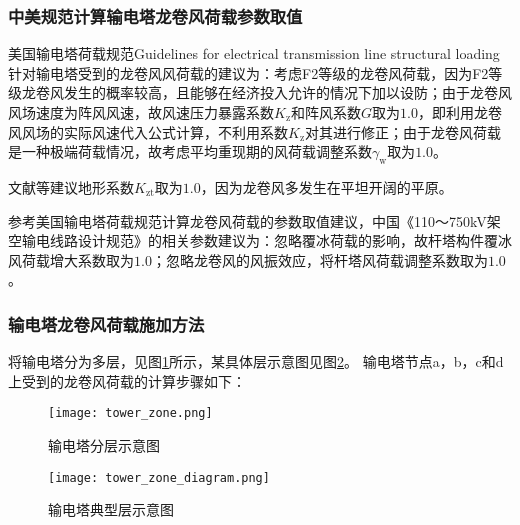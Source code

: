 \subsubsection{中美规范计算输电塔龙卷风荷载参数取值}
美国输电塔荷载规范Guidelines for electrical transmission line structural loading\cite{wong2009guidelines}针对输电塔受到的龙卷风风荷载的建议为：考虑F2等级的龙卷风荷载，因为F2等级龙卷风发生的概率较高，且能够在经济投入允许的情况下加以设防；由于龙卷风风场速度为阵风风速，故风速压力暴露系数$K_\mathrm{z}$和阵风系数$G$取为$1.0$，即利用龙卷风风场的实际风速代入公式计算，不利用系数$K_\mathrm{z}$对其进行修正；由于龙卷风荷载是一种极端荷载情况，故考虑平均重现期的风荷载调整系数$\gamma_\mathrm{w}$取为$1.0$。

文献\cite{hamada2010finite}\cite{hamada2011behaviour}\cite{altalmas2014finite}等建议地形系数$K_\mathrm{zt}$取为$1.0$，因为龙卷风多发生在平坦开阔的平原。

参考美国输电塔荷载规范计算龙卷风荷载的参数取值建议，中国《110～750kV架空输电线路设计规范》的相关参数建议为：忽略覆冰荷载的影响，故杆塔构件覆冰风荷载增大系数取为$1.0$；忽略龙卷风的风振效应，将杆塔风荷载调整系数取为$1.0$。

\subsubsection{输电塔龙卷风荷载施加方法}
将输电塔分为多层，见图\ref{fig:tower-zone}所示，某具体层示意图见图\ref{fig:tower-zone-diagram}。
输电塔节点a，b，c和d上受到的龙卷风荷载的计算步骤如下：
\begin{figure}[!htbp]
	\centering
	\texttt{[image: tower\_zone.png]}
	\caption{输电塔分层示意图}\label{fig:tower-zone}
\end{figure}

\begin{figure}[!htbp]
	\centering
	\texttt{[image: tower\_zone\_diagram.png]}
	\caption{输电塔典型层示意图}\label{fig:tower-zone-diagram}
\end{figure}

